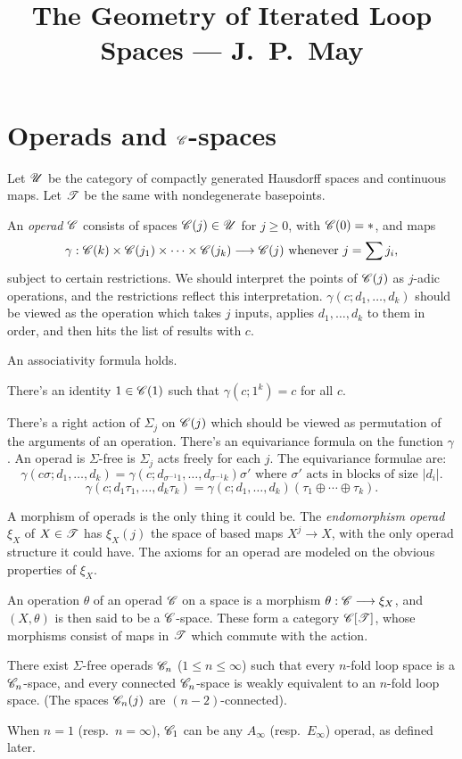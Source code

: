 \documentclass[11pt]{article}
\title{The Geometry of Iterated Loop Spaces\small{ --- J.\ P.\ May}}
\author{}
\date{}
\begin{document}

\section{Operads and \texorpdfstring{$\mathscr{C}$}{C}-spaces}
Let $\mathscr{U}$ be the category of compactly generated Hausdorff spaces and continuous
 maps. 
Let $\mathscr{T}$ be the same with nondegenerate basepoints.

An \emph{operad} $\mathscr{C}$ consists of spaces $\mathscr{C}(j)\in\mathscr{U}$ for $j\geq0$,
 with $\mathscr{C}(0)=*$, and maps
\[\gamma:\mathscr{C}(k)\times\mathscr{C}(j_1)\times\cdots\times\mathscr{C}(j_k)\longrightarrow\mathscr{C}(j)
\text{ whenever }j=\sum j_i,\]
subject to certain restrictions. We should interpret the points of $\mathscr{C}(j)$ as
$j$-adic operations, and the restrictions reflect this interpretation.
$\gamma(c;d_1,\ldots,d_k)$ should be viewed as the operation which takes $j$
inputs, applies $d_1,\ldots,d_k$ to them in order, and then hits the list of
results with $c$.
\begin{itemise}
\item An associativity formula holds.
\item There's an identity $1\in\mathscr{C}(1)$ such that $\gamma(c;1^k)=c$ for all $c$.
\item There's a right action of $\Sigma_j$ on $\mathscr{C}(j)$ which should be viewed as
permutation of the arguments of an operation. There's an equivariance formula on
the function $\gamma$. An operad is $\Sigma$-free is $\Sigma_j$ acts freely for
each $j$. The equivariance formulae are:
\[\gamma(c\sigma;d_1,\ldots,d_k)=\gamma(c;d_{\sigma^{-1}1},\ldots,
d_{\sigma^{-1}k})\sigma'\text{ where }\sigma'\text{ acts in 
blocks of size $|d_i|$}.\]
\[\gamma(c;d_1\tau_1,\ldots,d_k\tau_k)=\gamma(c;d_1,\ldots,d_k)(\tau_1\oplus
\cdots\oplus\tau_k).\]
\end{itemise}
A morphism of operads is the only thing it could be. The \emph{endomorphism
operad} $\xi_X$ of $X\in\mathscr{T}$ has $\xi_X(j)$ the space of based maps $X^j\to
X$, with the only operad structure it could have. The axioms for an operad are
modeled on the obvious properties of $\xi_X$.

An operation $\theta$ of an operad $\mathscr{C}$ on a space is a morphism
$\theta:\mathscr{C}\longrightarrow\xi_X$, and $(X,\theta)$ is then said to be a $\mathscr{C}$-space. These
form a category $\mathscr{C}[\mathscr{T}]$, whose morphisms consist of maps in $\mathscr{T}$ which
commute with the action.
\begin{thm*}[1.3]
There exist $\Sigma$-free operads $\mathscr{C}_n$ ($1\leq n\leq\infty$) such that every
$n$-fold loop space is a $\mathscr{C}_n$-space, and every connected $\mathscr{C}_n$-space
is weakly equivalent to an $n$-fold loop space. (The spaces $\mathscr{C}_n(j)$ are 
$(n-2)$-connected).
\end{thm*}
When $n=1$  (resp.\ $n=\infty$), $\mathscr{C}_1$ can be any $A_\infty$ 
(resp.\ $E_\infty$) operad, as defined later.
\end{document}
